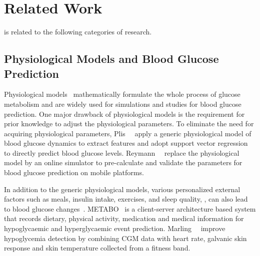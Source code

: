\section{Related Work}
\label{sec:relwork}
\sysname is related to the following categories of research.

\subsection{Physiological Models and Blood Glucose Prediction}
Physiological models~\cite{bib:TBE07:Dalla} \cite{bib:PE04:Hovorka} mathematically formulate the whole process of glucose metabolism and are widely used for simulations and studies for blood glucose prediction.
One major drawback of physiological models is the requirement for prior knowledge to adjust the physiological parameters.
To eliminate the need for acquiring physiological parameters, Plis~\etal~\cite{bib:MAIHA14:Plis} apply a generic physiological model of blood glucose dynamics to extract features and adopt support vector regression to directly predict blood glucose levels.
Reymann~\etal~\cite{bib:EMBC16:Reymann} replace the physiological model by an online simulator to pre-calculate and validate the parameters for blood glucose prediction on mobile platforms.

In addition to the generic physiological models, various personalized external factors such as meals, insulin intake, exercises, and sleep quality, \etc, can also lead to blood glucose changes~\cite{bib:DRCP15:Iwasaki}.
METABO~\cite{bib:EMBC09:Georga} is a client-server architecture based system that records dietary, physical activity, medication and medical information for hypoglycaemic and hyperglycaemic event prediction.
Marling~\etal~\cite{bib:KDHealth16:Marling} improve hypoglycemia detection by combining CGM data with heart rate, galvanic skin response and skin temperature collected from a fitness band.



